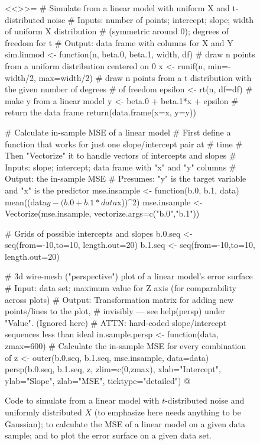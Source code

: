 \documentclass{article}
\begin{document}
\begin{figure}
<<>>=
# Simulate from a linear model with uniform X and t-distributed noise
# Inputs: number of points; intercept; slope; width of uniform X distribution
  # (symmetric around 0); degrees of freedom for t
# Output: data frame with columns for X and Y
sim.linmod <- function(n, beta.0, beta.1, width, df) {
    # draw n points from a uniform distribution centered on 0
    x <- runif(n, min=-width/2, max=width/2)
    # draw n points from a t distribution with the given number of degrees
    # of freedom
    epsilon <- rt(n, df=df)
    # make y from a linear model
    y <- beta.0 + beta.1*x + epsilon
    # return the data frame
    return(data.frame(x=x, y=y))
}

# Calculate in-sample MSE of a linear model
  # First define a function that works for just one slope/intercept pair at
  # time
  # Then "Vectorize" it to handle vectors of intercepts and slopes
# Inputs: slope; intercept; data frame with "x" and "y" columns
# Output: the in-sample MSE
# Presumes: "y" is the target variable and "x" is the predictor
mse.insample <- function(b.0, b.1, data) { mean((data$y-(b.0+b.1*data$x))^2) }
mse.insample <- Vectorize(mse.insample, vectorize.args=c("b.0","b.1"))

# Grids of possible intercepts and slopes
b.0.seq <- seq(from=-10,to=10, length.out=20)
b.1.seq <- seq(from=-10,to=10, length.out=20)

# 3d wire-mesh ("perspective") plot of a linear model's error surface
# Input: data set; maximum value for Z axis (for comparability across plots)
# Output: Transformation matrix for adding new points/lines to the plot,
  # invisibly --- see help(persp) under "Value".  (Ignored here)
# ATTN: hard-coded slope/intercept sequences less than ideal
in.sample.persp <- function(data, zmax=600) {
    # Calculate the in-sample MSE for every combination of
    z <- outer(b.0.seq, b.1.seq, mse.insample, data=data)
    persp(b.0.seq, b.1.seq, z, zlim=c(0,zmax), xlab="Intercept",
          ylab="Slope", zlab="MSE", ticktype="detailed")
}
@
\caption{Code to simulate from a linear model with $t$-distributed noise and
  uniformly distributed $X$ (to emphasize here needs anything to be Gaussian);
  to calculate the MSE of a linear model on a given data sample; and to
  plot the error surface on a given data set.}
\label{fig:error-surface-code}
\end{figure}
\end{document}
